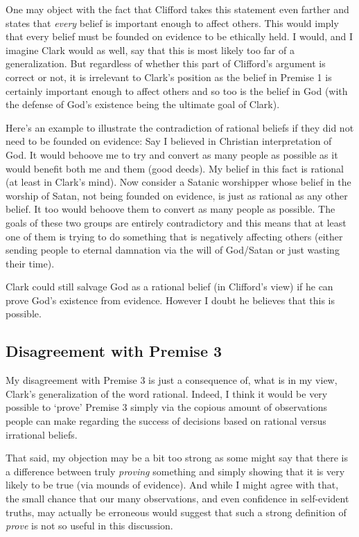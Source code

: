 \documentclass{article}
\begin{document}
One may object with the fact that Clifford takes this statement even farther and states that \textit{every} belief is important enough to affect others. This would imply that every belief must be founded on evidence to be ethically held. I would, and I imagine Clark would as well, say that this is most likely too far of a generalization. But regardless of whether this part of Clifford's argument is correct or not, it is irrelevant to Clark's position as the belief in Premise 1 is certainly important enough to affect others and so too is the belief in God (with the defense of God's existence being the ultimate goal of Clark).

Here's an example to illustrate the contradiction of rational beliefs if they did not need to be founded on evidence: Say I believed in Christian interpretation of God. It would behoove me to try and convert as many people as possible as it would benefit both me and them (good deeds). My belief in this fact is rational (at least in Clark's mind). Now consider a Satanic worshipper whose belief in the worship of Satan, not being founded on evidence, is just as rational as any other belief. It too would behoove them to convert as many people as possible. The goals of these two groups are entirely contradictory and this means that at least one of them is trying to do something that is negatively affecting others (either sending people to eternal damnation via the will of God/Satan or just wasting their time).

Clark could still salvage God as a rational belief (in Clifford's view) if he can prove God's existence from evidence. However I doubt he believes that this is possible.

\subsection{Disagreement with Premise 3}
My disagreement with Premise 3 is just a consequence of, what is in my view, Clark's generalization of the word rational. Indeed, I think it would be very possible to `prove' Premise 3 simply via the copious amount of observations people can make regarding the success of decisions based on rational versus irrational beliefs.

That said, my objection may be a bit too strong as some might say that there is a difference between truly \textit{proving} something and simply showing that it is very likely to be true (via mounds of evidence). And while I might agree with that, the small chance that our many observations, and even confidence in self-evident truths, may actually be erroneous would suggest that such a strong definition of \textit{prove} is not so useful in this discussion.
\end{document}
